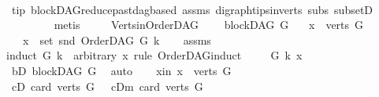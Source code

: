 \begin{isabellebody}
\ \ \ \ \ \ \ \isamarkupfalse%
\ tip\ blockDAG{\isachardot}{\kern0pt}reduce{\isacharunderscore}{\kern0pt}past{\isacharunderscore}{\kern0pt}dagbased\ assms{\isacharparenleft}{\kern0pt}{}{\isacharparenright}{\kern0pt}\ digraph{\isachardot}{\kern0pt}tips{\isacharunderscore}{\kern0pt}in{\isacharunderscore}{\kern0pt}verts\ subs\ subsetD\isanewline
\ \ \ \ \ \ \ \isamarkupfalse%
\ metis\ \ \ \ \isanewline
{}\isamarkupfalse%
%
\endisatagproof
{\isafoldproof}%
%
\isadelimproof
%
\endisadelimproof
%
\isadelimdocument
%
\endisadelimdocument
%
\isatagdocument
%
\isamarkuptrue%
%
\endisatagdocument
{\isafolddocument}%
%
\isadelimdocument
%
\endisadelimdocument
{}\isamarkupfalse%
\ Verts{\isacharunderscore}{\kern0pt}in{\isacharunderscore}{\kern0pt}OrderDAG{\isacharcolon}{\kern0pt}\ \isanewline
\ \ \ {\isachardoublequoteopen}blockDAG\ G{\isachardoublequoteclose}\isanewline
\ \ \ {\isachardoublequoteopen}x\ {\isasymin}\ verts\ G{\isachardoublequoteclose}\isanewline
\ \ \ {\isachardoublequoteopen}x\ {\isasymin}\ set\ {\isacharparenleft}{\kern0pt}snd\ {\isacharparenleft}{\kern0pt}OrderDAG\ G\ k{\isacharparenright}{\kern0pt}{\isacharparenright}{\kern0pt}{\isachardoublequoteclose}\isanewline
%
\isadelimproof
\ \ %
\endisadelimproof
%
\isatagproof
{}\isamarkupfalse%
\ assms\isanewline
{}\isamarkupfalse%
{\isacharparenleft}{\kern0pt}induct\ G\ k\ \ arbitrary{\isacharcolon}{\kern0pt}\ x\ rule{\isacharcolon}{\kern0pt}\ OrderDAG{\isachardot}{\kern0pt}induct{\isacharparenright}{\kern0pt}\isanewline
\ \ \isamarkupfalse%
\ {\isacharparenleft}{\kern0pt}{}\ G\ k\ x{\isacharparenright}{\kern0pt}\isanewline
\ \ \isamarkupfalse%
\ \isamarkupfalse%
\ bD{\isacharcolon}{\kern0pt}\ {\isachardoublequoteopen}blockDAG\ G{\isachardoublequoteclose}\ \isamarkupfalse%
\ auto\isanewline
\ \ \isamarkupfalse%
\ x{\isacharunderscore}{\kern0pt}in{\isacharcolon}{\kern0pt}\ {\isachardoublequoteopen}x\ {\isasymin}\ verts\ G{\isachardoublequoteclose}\isanewline
\ \ \isamarkupfalse%
\ \isamarkupfalse%
\ {\isacharparenleft}{\kern0pt}cD{}{\isacharparenright}{\kern0pt}\ {\isachardoublequoteopen}card\ {\isacharparenleft}{\kern0pt}verts\ G{\isacharparenright}{\kern0pt}\ {\isacharequal}{\kern0pt}\ {}{\isachardoublequoteclose}{\isacharbar}{\kern0pt}\ {\isacharparenleft}{\kern0pt}cDm{\isacharparenright}{\kern0pt}\ {\isachardoublequoteopen}card\ {\isacharparenleft}{\kern0pt}verts\ G{\isacharparenright}{\kern0pt}\ {\isasymnoteq}\ {}{\isachardoublequoteclose}\ \isamarkupfalse%

\end{isabellebody}
